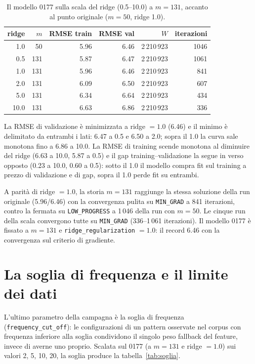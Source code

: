 \begin{table}[ht]
\centering
\small
\begin{tabular}{rrrrrr}
\toprule
ridge & $m$ & RMSE train & RMSE val & $W$ & iterazioni \\
\midrule
1.0 & 50 & 5.96 & 6.46 & 2\,210\,923 & 1046 \\
0.5 & 131 & 5.87 & 6.47 & 2\,210\,923 & 1061 \\
1.0 & 131 & 5.96 & 6.46 & 2\,210\,923 & 841 \\
2.0 & 131 & 6.09 & 6.50 & 2\,210\,923 & 607 \\
5.0 & 131 & 6.34 & 6.64 & 2\,210\,923 & 434 \\
10.0 & 131 & 6.63 & 6.86 & 2\,210\,923 & 336 \\
\bottomrule
\end{tabular}
\caption{Il modello 0177 sulla scala del ridge (0.5--10.0) a
$m = 131$, accanto al punto originale ($m = 50$, ridge 1.0).}
\label{tab:ridge}
\end{table}

La RMSE di validazione è minimizzata a ridge $= 1.0$ (6.46) e il
minimo è delimitato da entrambi i lati: 6.47 a 0.5 e 6.50 a 2.0;
sopra il 1.0 la curva sale monotona fino a 6.86 a 10.0. La RMSE
di training scende monotona al diminuire del ridge (6.63 a 10.0,
5.87 a 0.5) e il gap training--validazione la segue in verso
opposto (0.23 a 10.0, 0.60 a 0.5): sotto il 1.0 il modello
compra fit sul training a prezzo di validazione e di gap, sopra
il 1.0 perde fit su entrambi.

A parità di ridge $= 1.0$, la storia $m = 131$ raggiunge la
stessa soluzione della run originale (5.96/6.46) con la
convergenza pulita su \texttt{MIN\_GRAD} a 841 iterazioni,
contro la fermata su \texttt{LOW\_PROGRESS} a 1\,046 della
run con $m = 50$. Le cinque run della scala convergono tutte su
\texttt{MIN\_GRAD} (336--1\,061 iterazioni). Il modello 0177 è
fissato a $m = 131$ e \texttt{ridge\_regularization} $= 1.0$:
il record 6.46 con la convergenza sul criterio di gradiente.

\section{La soglia di frequenza e il limite dei dati}

L'ultimo parametro della campagna è la soglia di frequenza
(\texttt{frequency\_cut\_off}): le configurazioni di un pattern
osservate nel corpus con frequenza inferiore alla soglia
condividono il singolo peso fallback del feature, invece di
averne uno proprio. Scalata sul 0177 (a $m = 131$ e ridge
$= 1.0$) sui valori 2, 5, 10, 20, la soglia produce la
tabella~\ref{tab:soglia}.

